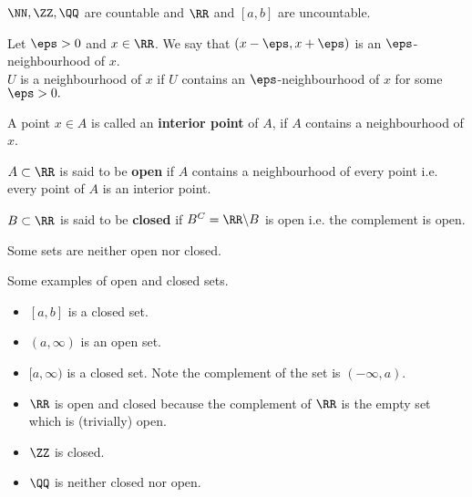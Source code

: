 \documentclass[12pt, a4paper]{article}
\begin{document}
\begin{example}
    \(\NN, \ZZ, \QQ\) are countable and \(\RR\) and \([a,b]\) are uncountable.
\end{example}

\begin{definition}
    Let \(\eps >0\) and \(x\in \RR\). We say that \((x-\eps,x+\eps)\) is an \(\eps\)-neighbourhood of \(x\). \\
    \(U\) is a neighbourhood of \(x\) if \(U\) contains an \(\eps\)-neighbourhood of \(x\) for some \(\eps>0.\)
\end{definition}

\begin{definition}
   A point \(x\in A\) is called an \textbf{interior point} of \(A\), if \(A\) contains a neighbourhood of \(x\).
\end{definition}

\begin{definition}
    \(A \subset \RR\) is said to be \textbf{open} if \(A\) contains a neighbourhood of every point i.e. every point of \(A\) is an interior point.
\end{definition}

\begin{definition}
    \(B \subset \RR\) is said to be \textbf{closed} if \(B^C = \RR \backslash B\) is open i.e. the complement is open.
\end{definition}

\begin{mdremark}
    Some sets are neither open nor closed.
\end{mdremark}

\begin{example} 
    Some examples of open and closed sets.
    \begin{itemize}
        \item \([a,b]\) is a closed set.
        \item \((a,\infty)\) is an open set.
        \item \([a,\infty)\) is a closed set. Note the complement of the set is \((-\infty,a)\).
        \item \(\RR\) is open and closed because the complement of \(\RR\) is the empty set which is (trivially) open.
        \item \(\ZZ\) is closed.
        \item \(\QQ\) is neither closed nor open.
    \end{itemize}
\end{example}
\end{document}
